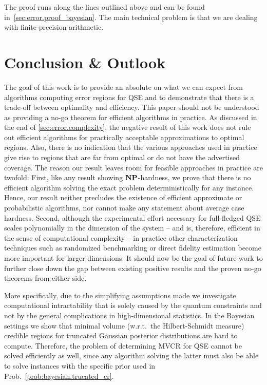 The proof runs along the lines outlined above and can be found in~\ref{sec:error.proof_bayesian}.
The main technical problem is that we are dealing with finite-precision arithmetic.

\section{Conclusion \& Outlook}
\label{sec:error.outlook}

The goal of this work is to provide an absolute  on what we can expect from algorithms computing error regions for QSE and to demonstrate that there is a trade-off between optimality and efficiency.
This paper should not be understood as providing a no-go theorem for efficient algorithms in practice.
As discussed in the end of \cref{sec:error.complexity}, the negative result of this work does not rule out efficient algorithms for practically acceptable approximations to optimal regions.
Also, there is no indication that the various approaches used in practice give rise to regions that are far from optimal or do not have the advertised coverage.
The reason our result leaves room for feasible approaches in practice are twofold:
First, like any result showing $\mathbf{NP}$-hardness, we prove that there is no efficient algorithm solving the exact problem deterministically for any instance.
Hence, our result neither precludes the existence of efficient approximate or probabilistic algorithms, nor cannot make any statement about average case hardness.
Second, although the experimental effort necessary for full-fledged QSE scales polynomially in the dimension of the system -- and is, therefore, efficient in the sense of computational complexity -- in practice other characterization techniques such as randomized benchmarking or direct fidelity estimation become more important for larger dimensions.
It should now be the goal of future work to further close down the gap between existing positive results and the proven no-go theorems from either side.

More specifically, due to the simplifying assumptions made we investigate computational intractability that is solely caused by the quantum constraints and not by the general complications in high-dimensional statistics.
In the Bayesian settings we show that minimal volume (w.r.t.\ the Hilbert-Schmidt measure) credible regions for truncated Gaussian posterior distributions are hard to compute.
Therefore, the problem of determining MVCR for QSE cannot be solved efficiently as well, since any algorithm solving the latter must also be able to solve instances with the specific prior used in Prob.~\ref{prob:bayesian.trucated_cr}.

